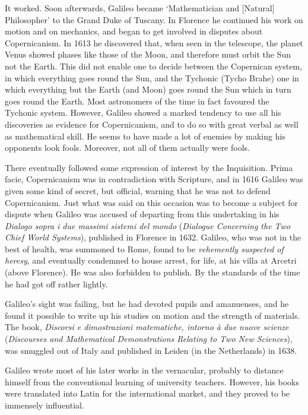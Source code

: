 It worked. Soon afterwards, Galileo became ‘Mathematician and [Natural] Philosopher’ to the Grand Duke of Tuscany. In Florence he continued his work on motion and on mechanics, and began to get involved in disputes about Copernicanism. In 1613 he discovered that, when seen in the telescope, the planet Venus showed phases like those of the Moon, and therefore must orbit the Sun not the Earth. This did not enable one to decide between the Copernican system, in which everything goes round the Sun, and the Tychonic (Tycho Brahe) one in which everything but the Earth (and Moon) goes round the Sun which in turn goes round the Earth. Most astronomers of the time in fact favoured the Tychonic system. However, Galileo showed a marked tendency to use all his discoveries as evidence for Copernicanism, and to do so with great verbal as well as mathematical skill. He seems to have made a lot of enemies by making his opponents look fools. Moreover, not all of them actually were fools.

There eventually followed some expression of interest by the Inquisition. Prima facie, Copernicanism was in contradiction with Scripture, and in 1616 Galileo was given some kind of secret, but official, warning that he was not to defend Copernicanism. Just what was said on this occasion was to become a subject for dispute when Galileo was accused of departing from this undertaking in his \textit{Dialogo sopra i due massimi sistemi del mondo} (\textit{Dialogue Concerning the Two Chief World Systems}), published in Florence in 1632. Galileo, who was not in the best of health, was summoned to Rome, found to be \textit{vehemently suspected of heresy}, and eventually condemned to house arrest, for life, at his villa at Arcetri (above Florence). He was also forbidden to publish. By the standards of the time he had got off rather lightly.

Galileo's sight was failing, but he had devoted pupils and amanuenses, and he found it possible to write up his studies on motion and the strength of materials. The book, \textit{Discorsi e dimostrazioni matematiche, intorno à due nuove scienze} (\textit{Discourses and Mathematical Demonstrations Relating to Two New Sciences}), was smuggled out of Italy and published in Leiden (in the Netherlands) in 1638.

Galileo wrote most of his later works in the vernacular, probably to distance himself from the conventional learning of university teachers. However, his books were translated into Latin for the international market, and they proved to be immensely influential.

